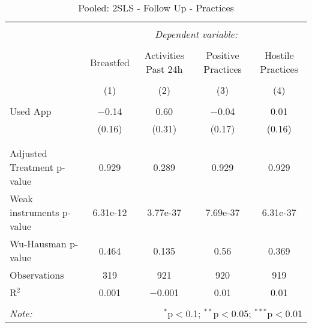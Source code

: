 
\begin{table}[!htbp] \centering 
  \caption{Pooled: 2SLS - Follow Up - Practices} 
  \label{tbl:Pooled: 2SLS - Follow Up - Practices} 
\begin{tabular}{@{\extracolsep{5pt}}lcccc} 
\\[-1.8ex]\hline 
\hline \\[-1.8ex] 
 & \multicolumn{4}{c}{\textit{Dependent variable:}} \\ 
\cline{2-5} 
\\[-1.8ex] & Breastfed & Activities Past 24h & Positive Practices & Hostile Practices \\ 
\\[-1.8ex] & (1) & (2) & (3) & (4)\\ 
\hline \\[-1.8ex] 
 Used App & $-$0.14 & 0.60 & $-$0.04 & 0.01 \\ 
  & (0.16) & (0.31) & (0.17) & (0.16) \\ 
  & & & & \\ 
\hline \\[-1.8ex] 
Adjusted Treatment p-value & 0.929 & 0.289 & 0.929 & 0.929 \\ 
Weak instruments p-value & 6.31e-12 & 3.77e-37 & 7.69e-37 & 6.31e-37 \\ 
Wu-Hausman p-value & 0.464 & 0.135 & 0.56 & 0.369 \\ 
Observations & 319 & 921 & 920 & 919 \\ 
R$^{2}$ & 0.001 & $-$0.001 & 0.01 & 0.01 \\ 
\hline 
\hline \\[-1.8ex] 
\textit{Note:}  & \multicolumn{4}{r}{$^{*}$p$<$0.1; $^{**}$p$<$0.05; $^{***}$p$<$0.01} \\ 
\end{tabular} 
\end{table} 
